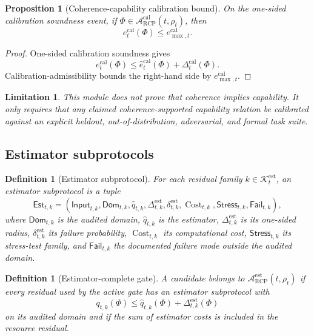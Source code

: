 \documentclass[11pt]{article}
\newtheorem{proposition}[theorem]{Proposition}
\newtheorem{definition}[theorem]{Definition}
\newtheorem{limitation}[theorem]{Limitation}
\newcommand{\Acal}{\mathcal{A}}
\newcommand{\1}{\mathbf{1}}
\newcommand{\RCP}{\mathrm{RCP}}
\providecommand{\Kcal}{\mathcal{K}}
\providecommand{\Cost}{\operatorname{Cost}}
\begin{document}
\begin{proposition}[Coherence-capability calibration bound]
\label{prop:coherence_capability_calibration_bound}
On the one-sided calibration soundness event, if \(\Phi\in\Acal_{\RCP}^{\mathrm{cal}}(t,\rho_t)\), then
\[
e_t^{\mathrm{cal}}(\Phi)
\le e_{\max,t}^{\mathrm{cal}}.
\]
\end{proposition}

\begin{proof}
One-sided calibration soundness gives
\[
e_t^{\mathrm{cal}}(\Phi)
\le
\widehat e_t^{\mathrm{cal}}(\Phi)+\Delta_t^{\mathrm{cal}}(\Phi).
\]
Calibration-admissibility bounds the right-hand side by \(e_{\max,t}^{\mathrm{cal}}\).
\end{proof}

\begin{limitation}
This module does not prove that coherence implies capability.  It only requires that any claimed coherence-supported capability relation be calibrated against an explicit heldout, out-of-distribution, adversarial, and formal task suite.
\end{limitation}

\subsection{Estimator subprotocols}

\begin{definition}[Estimator subprotocol]
\label{def:estimator_subprotocol_operational}
For each residual family \(k\in\Kcal_t^{\mathrm{est}}\), an estimator subprotocol is a tuple
\[
\mathsf{Est}_{t,k}
=
(\mathsf{Input}_{t,k},\mathsf{Dom}_{t,k},\widehat q_{t,k},\Delta_{t,k}^{\mathrm{est}},\delta_{t,k}^{\mathrm{est}},\Cost_{t,k},\mathsf{Stress}_{t,k},\mathsf{Fail}_{t,k}),
\]
where \(\mathsf{Dom}_{t,k}\) is the audited domain, \(\widehat q_{t,k}\) is the estimator, \(\Delta_{t,k}^{\mathrm{est}}\) is its one-sided radius, \(\delta_{t,k}^{\mathrm{est}}\) its failure probability, \(\Cost_{t,k}\) its computational cost, \(\mathsf{Stress}_{t,k}\) its stress-test family, and \(\mathsf{Fail}_{t,k}\) the documented failure mode outside the audited domain.
\end{definition}

\begin{definition}[Estimator-complete gate]
\label{def:estimator_complete_gate_operational}
A candidate belongs to \(\Acal_{\RCP}^{\mathrm{est}}(t,\rho_t)\) if every residual used by the active gate has an estimator subprotocol with
\[
q_{t,k}(\Phi)
\le
\widehat q_{t,k}(\Phi)+\Delta_{t,k}^{\mathrm{est}}(\Phi)
\]
on its audited domain and if the sum of estimator costs is included in the resource residual.
\end{definition}
\end{document}
